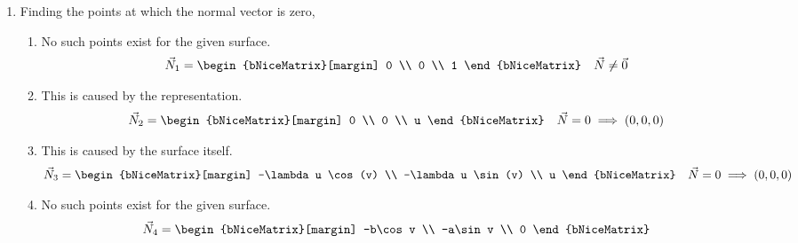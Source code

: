 \begin{enumerate}
    \item Finding the points at which the normal vector is zero,
          \begin{enumerate}
              \item No such points exist for the given surface.
                    \begin{align}
                        \vec{N}_1 & = \begin{bNiceMatrix}[margin]
                                          0 \\ 0 \\ 1
                                      \end{bNiceMatrix} &
                        \vec{N}   & \neq \vec{0}
                    \end{align}
              \item This is caused by the \textcolor{y_p}{representation}.
                    \begin{align}
                        \vec{N}_2   & = \begin{bNiceMatrix}[margin]
                                            0 \\ 0 \\ u
                                        \end{bNiceMatrix} &
                        \vec{N} = 0 & \implies (0, 0, 0)
                    \end{align}
              \item This is caused by the \textcolor{y_h}{surface itself}.
                    \begin{align}
                        \vec{N}_3                                     & =
                        \begin{bNiceMatrix}[margin]
                            -\lambda u \cos(v) \\ -\lambda u \sin(v) \\ u
                        \end{bNiceMatrix} &
                        \vec{N} = 0                                   &
                        \implies (0, 0, 0)
                    \end{align}
              \item No such points exist for the given surface.
                    \begin{align}
                        \vec{N}_4                   & =
                        \begin{bNiceMatrix}[margin]
                            -b\cos v \\ -a\sin v \\ 0

\end{bNiceMatrix}
\end{align}
\end{enumerate}
\end{enumerate}
